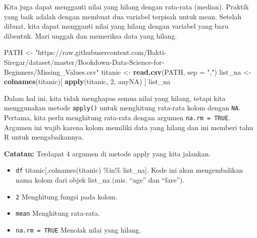\documentclass[
]{book}
\newenvironment{Shaded}{\begin{snugshade}}{\end{snugshade}}
\newcommand{\DataTypeTok}[1]{\textcolor[rgb]{0.13,0.29,0.53}{#1}}
\newcommand{\DecValTok}[1]{\textcolor[rgb]{0.00,0.00,0.81}{#1}}
\newcommand{\KeywordTok}[1]{\textcolor[rgb]{0.13,0.29,0.53}{\textbf{#1}}}
\newcommand{\NormalTok}[1]{#1}
\newcommand{\OperatorTok}[1]{\textcolor[rgb]{0.81,0.36,0.00}{\textbf{#1}}}
\newcommand{\OtherTok}[1]{\textcolor[rgb]{0.56,0.35,0.01}{#1}}
\newcommand{\StringTok}[1]{\textcolor[rgb]{0.31,0.60,0.02}{#1}}
\providecommand{\tightlist}{%
  \setlength{\itemsep}{0pt}\setlength{\parskip}{0pt}}
\begin{document}
Kita juga dapat mengganti nilai yang hilang dengan rata-rata (median). Praktik yang baik adalah dengan membuat dua variabel terpisah untuk mean. Setelah dibuat, kita dapat mengganti nilai yang hilang dengan variabel yang baru dibentuk. Mari unggah dan memeriksa data yang hilang.

\begin{Shaded}
\begin{Highlighting}[]
\NormalTok{PATH <-}\StringTok{ "https://raw.githubusercontent.com/Bakti-Siregar/dataset/master/Bookdown-Data-Science-for-Beginners/Missing_Values.csv"}
\NormalTok{titanic <-}\StringTok{ }\KeywordTok{read.csv}\NormalTok{(PATH, }\DataTypeTok{sep =} \StringTok{","}\NormalTok{)}
\NormalTok{list_na <-}\StringTok{ }\KeywordTok{colnames}\NormalTok{(titanic)[ }\KeywordTok{apply}\NormalTok{(titanic, }\DecValTok{2}\NormalTok{, anyNA) ]}
\NormalTok{list_na}
\end{Highlighting}
\end{Shaded}

Dalam hal ini, kita tidak menghapus semua nilai yang hilang, tetapi kita menggunakan metode \texttt{apply()} untuk menghitung rata-rata kolom dengan \texttt{NA}. Pertama, kita perlu menghitung rata-rata dengan argumen \texttt{na.rm\ =\ TRUE}. Argumen ini wajib karena kolom memiliki data yang hilang dan ini memberi tahu R untuk mengabaikannya.

\begin{Shaded}
\end{Shaded}

\textbf{Catatan:} Terdapat 4 argumen di metode apply yang kita jalankan.

\begin{itemize}
\tightlist
\item
  \texttt{df} titanic{[},colnames(titanic) \%in\% list\_na{]}. Kode ini akan mengembalikan nama kolom dari objek list\_na (mis. ``age'' dan ``fare'').
\item
  \texttt{2} Menghitung fungsi pada kolom.
\item
  \texttt{mean} Menghitung rata-rata.
\item
  \texttt{na.rm\ =\ TRUE} Menolak nilai yang hilang.
\end{itemize}
\end{document}
